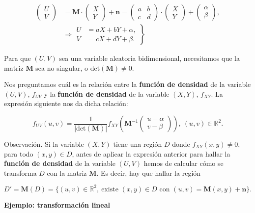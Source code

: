 \documentclass[]{book}
\begin{document}
\[
\begin{array}{rl}
\begin{pmatrix}U\\ V\end{pmatrix} & =\mathbf{M}\cdot \begin{pmatrix}X\\ Y\end{pmatrix}+\mathbf{n}=\begin{pmatrix}a & b\\ c& d\end{pmatrix}\cdot\begin{pmatrix}X\\ Y\end{pmatrix}+\begin{pmatrix}\alpha\\\beta \end{pmatrix},\\  & \Rightarrow \left.\begin{array}{rl}U & = aX+bY+\alpha,\\ V & =cX+dY+\beta.\end{array}\right\}
\end{array}
\]

Para que \((U,V)\) sea una variable aleatoria bidimensional, necesitamos que la matriz \(\mathbf{M}\) sea no singular, o \(\mathrm{det}(\mathbf{M})\neq 0\).

Nos preguntamos cuál es la relación entre la \textbf{función de densidad} de la variable \((U,V)\), \(f_{UV}\) y la \textbf{función de densidad} de la variable \((X,Y)\), \(f_{XY}\). La expresión siguiente nos da dicha relación:

\[
f_{UV}(u,v)=\frac{1}{|\mathrm{det}(\mathbf{M})|}f_{XY}\left(\mathbf{M}^{-1}\begin{pmatrix}u-\alpha\\ v-\beta\end{pmatrix}\right), \ (u,v)\in\mathbb{R}^2.
\]

Observación.
Si la variable \((X,Y)\) tiene una región \(D\) donde \(f_{XY}(x,y)\neq 0\), para todo \((x,y)\in D\), antes de aplicar la expresión anterior para hallar la \textbf{función de densidad} de la variable \((U,V)\) hemos de calcular cómo se transforma \(D\) con la matriz \(\mathbf{M}\). Es decir, hay que hallar la región

\[
D'=\mathbf{M}(D)=\{(u,v)\in\mathbb{R}^2,\ \mbox{existe $(x,y)\in D$ con } (u,v)=\mathbf{M}(x,y)+\mathbf{n}\}.
\]

\textbf{Ejemplo: transformación lineal}
\end{document}
